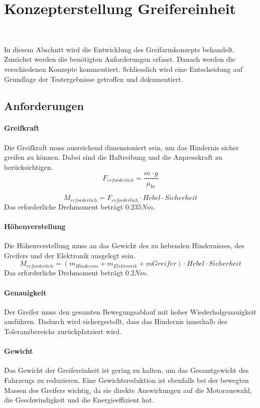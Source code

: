 \documentclass[main.tex]{subfiles} %
\begin{document}
\section{Konzepterstellung Greifereinheit}~\label{appendix:Greifereinheit}

In diesem Abschntt wird die Entwicklung des Greifarmkonzepts behandelt.
Zunächst werden die benötigten Anforderungen erfasst. 
Danach werden die verschiedenen Konzepte kommentiert.
Schliesslich wird eine Entscheidung auf Grundlage der Testergebnisse getroffen und dokumentiert.

\subsection*{Anforderungen}

\paragraph{Greifkraft}
Die Greifkraft muss ausreichend dimensioniert sein, um das Hindernis sicher greifen zu können.
Dabei sind die Haftreibung und die Anpresskraft zu berücksichtigen.
\[
    F_{erforderlich} = \frac{m \cdot g}{\mu_{\text{hr}}}
\]

\[
    M_{erforderlich} = F_{erforderlich} \cdot Hebel \cdot Sicherheit
\]
Das erforderliche Drehmoment beträgt $0.235 Nm$.

\paragraph{Höhenverstellung}
Die Höhenverstellung muss an das Gewicht des zu hebenden Hindernisses, des Greifers und der Elektronik ausgelegt sein.
\[
    M_{erforderlich} = (m_{Hindernis} + m_{Elektronik} + m{Greifer}) \cdot Hebel \cdot Sicherheit
\]
Das erforderliche Drehmoment beträgt $0.2 Nm$.

\paragraph{Genauigkeit}
Der Greifer muss den gesamten Bewegungsablauf mit hoher Wiederholgenauigkeit ausführen.
Dadurch wird sichergestellt, dass das Hindernis innerhalb des Toleranzbereichs
zurückplatziert wird.

\paragraph{Gewicht}
Das Gewicht der Greifereinheit ist gering zu halten, um das Gesamtgewicht des Fahrzeugs zu
reduzieren. Eine Gewichtsreduktion ist ebenfalls bei der bewegten Massen des Greifers wichtig, da sie
direkte Auswirkungen auf die Motorauswahl, die Geschwindigkeit und die Energieeffizient hat.
\end{document}

